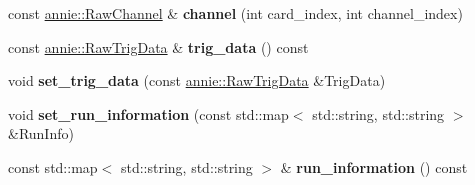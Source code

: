 \begin{DoxyCompactItemize}
\item 
\hypertarget{classannie_1_1RawReadout_ac37668ed3755818512309f1b83bdf1ae}{
const \hyperlink{classannie_1_1RawChannel}{annie::RawChannel} \& {\bfseries channel} (int card\_\-index, int channel\_\-index)}
\label{classannie_1_1RawReadout_ac37668ed3755818512309f1b83bdf1ae}

\item 
\hypertarget{classannie_1_1RawReadout_aefe2a5354731f34444e74255fd5a0cc2}{
const \hyperlink{classannie_1_1RawTrigData}{annie::RawTrigData} \& {\bfseries trig\_\-data} () const }
\label{classannie_1_1RawReadout_aefe2a5354731f34444e74255fd5a0cc2}

\item 
\hypertarget{classannie_1_1RawReadout_a4c9c106ed001152f2ba692ffa8bac46f}{
void {\bfseries set\_\-trig\_\-data} (const \hyperlink{classannie_1_1RawTrigData}{annie::RawTrigData} \&TrigData)}
\label{classannie_1_1RawReadout_a4c9c106ed001152f2ba692ffa8bac46f}

\item 
\hypertarget{classannie_1_1RawReadout_ab21d5580b782f2a7d636dd2686b6fc3f}{
void {\bfseries set\_\-run\_\-information} (const std::map$<$ std::string, std::string $>$ \&RunInfo)}
\label{classannie_1_1RawReadout_ab21d5580b782f2a7d636dd2686b6fc3f}

\item 
\hypertarget{classannie_1_1RawReadout_a437ecbef57b303fa307e6f19ec26d698}{
const std::map$<$ std::string, std::string $>$ \& {\bfseries run\_\-information} () const }
\label{classannie_1_1RawReadout_a437ecbef57b303fa307e6f19ec26d698}

\end{DoxyCompactItemize}
